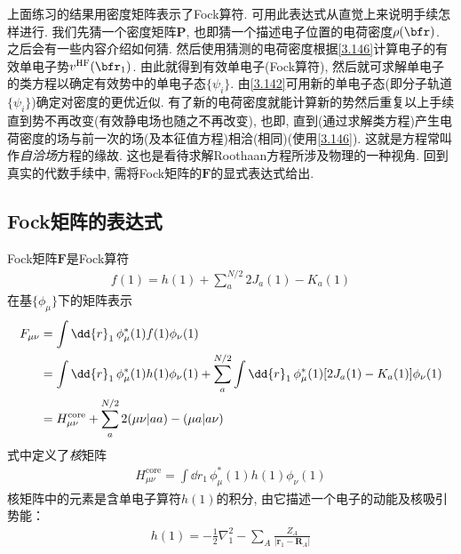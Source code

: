 上面练习的结果用密度矩阵表示了Fock算符. 可用此表达式从直觉上来说明\hft 手续怎样进行. 我们先猜一个密度矩阵$\mathbf{P}$, 也即猜一个描述电子位置的电荷密度$\rho(\bfr)$. 之后会有一些内容介绍如何猜. 然后使用猜测的电荷密度根据\eqref{3.146}计算电子的有效单电子势$v^\mathrm{HF}(\bfr_1)$. 由此就得到有效单电子\ha (Fock算符), 然后就可求解单电子的类\sch 方程以确定有效势中的单电子态$\{\psi_i\}$. 由\eqref{3.142}可用新的单电子态(即分子轨道$\{\psi_i\}$)确定对密度的更优近似. 有了新的电荷密度就能计算新的\hft 势然后重复以上手续直到\hft 势不再改变(有效静电场也随之不再改变), 也即, 直到(通过求解类\sch 方程)产生电荷密度的场与前一次的场(及\hft 本征值方程)相洽(相同)(使用\eqref{3.146}). 这就是\hft 方程常叫作\emph{自洽场}方程的缘故. 这也是看待求解Roothaan方程所涉及物理的一种视角. 回到真实的代数手续中, 需将Fock矩阵的$\mathbf{F}$的显式表达式给出.
\subsection{Fock矩阵的表达式}
Fock矩阵$\mathbf{F}$是Fock算符
\begin{align}
f(1) = h(1) + \sum_{a}^{N/2}2J_a(1) -K_a(1)
\end{align}
在基$\{\phi_\mu\}$下的矩阵表示
\begin{align}
\label{3.148}
F_{\mu\nu} & = \int\dd{r}_1\,\phi_\mu^*(1)f(1)\phi_\nu(1)\notag\\
           & = \int\dd{r}_1\,\phi_\mu^*(1)h(1)\phi_\nu(1) + \sum_{a}^{N/2}\int\dd{r}_1\,\phi_\mu^*(1)[2J_a(1)-K_a(1)]\phi_\nu(1)\notag\\
           & = H_{\mu\nu}^\mathrm{core} + \sum_{a}^{N/2}2(\mu\nu|aa)-(\mu a|a\nu)
\end{align}
式中定义了\emph{核\ha}矩阵
\begin{align}
H_{\mu\nu}^\mathrm{core} = \int\dd{r}_1\,\phi_\mu^*(1)h(1)\phi_\nu(1)
\end{align}
核\ha 矩阵中的元素是含单电子算符$h(1)$的积分, 由它描述一个电子的动能及核吸引势能：
\begin{align}
h(1) = -\frac{1}{2}\nabla_1^2 - \sum_A\frac{Z_A}{|\mathbf{r}_1-\mathbf{R}_A|}
\end{align}

